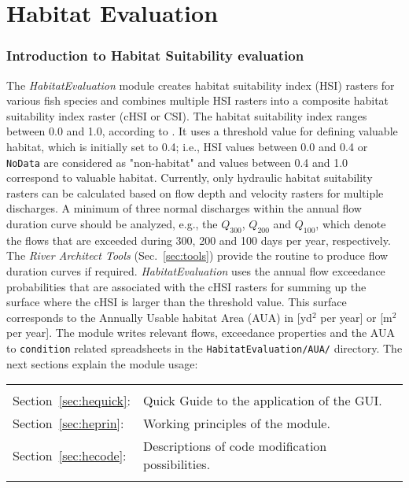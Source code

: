 \newpage
\part{Habitat Evaluation} \label{part:he}

\section{Introduction to Habitat Suitability evaluation} \label{sec:heintro}
The \textit{HabitatEvaluation} module creates habitat suitability index (HSI) rasters for various fish species and combines multiple HSI rasters into a composite habitat suitability index raster (cHSI or CSI). The habitat suitability index ranges between 0.0 and 1.0, according to \citet{bovee86}. It uses a threshold value for defining valuable habitat, which is initially set to 0.4; i.e., HSI values between 0.0 and 0.4 or \texttt{NoData} are considered as "non-habitat" and values between 0.4 and 1.0 correspond to valuable habitat. Currently, only hydraulic habitat suitability rasters can be calculated based on flow depth and velocity rasters for multiple discharges. A minimum of three normal discharges within the annual flow duration curve should be analyzed, e.g., the $Q_{300}$, $Q_{200}$ and $Q_{100}$, which denote the flows that are exceeded during 300, 200 and 100 days per year, respectively. The \textit{River Architect Tools} (Sec.~\ref{sec:tools}) provide the  routine to produce flow duration curves if required. \textit{HabitatEvaluation} uses the annual flow exceedance probabilities that are associated with the cHSI rasters for summing up the surface where the cHSI is larger than the threshold value. This surface corresponds to the Annually Usable habitat Area (AUA) in [yd$^2$ per year] or [m$^2$ per year]. The module writes relevant flows, exceedance properties and the AUA to \texttt{condition} related spreadsheets in the \texttt{HabitatEvaluation/AUA/} directory. The next sections explain the module usage:\\

\begin{tabular}{l L{0.9\textwidth}}
\\
Section~\ref{sec:hequick}: & Quick Guide to the application of the GUI.\\
Section~\ref{sec:heprin}:  & Working principles of the module.\\
Section~\ref{sec:hecode}:  & Descriptions of code modification possibilities.\\
\\
\end{tabular}



